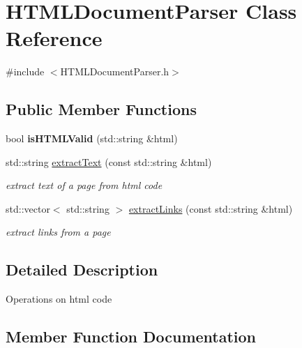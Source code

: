 \hypertarget{classHTMLDocumentParser}{}\section{H\+T\+M\+L\+Document\+Parser Class Reference}
\label{classHTMLDocumentParser}


{\ttfamily \#include $<$H\+T\+M\+L\+Document\+Parser.\+h$>$}

\subsection*{Public Member Functions}
\begin{DoxyCompactItemize}
\item 
bool {\bfseries is\+H\+T\+M\+L\+Valid} (std\+::string \&html)\hypertarget{classHTMLDocumentParser_a30e99ba7e6164ab947b8521e8a560b66}{}\label{classHTMLDocumentParser_a30e99ba7e6164ab947b8521e8a560b66}

\item 
std\+::string \hyperlink{classHTMLDocumentParser_af6e652d8ebeaba42076efb746745db15}{extract\+Text} (const std\+::string \&html)
\begin{DoxyCompactList}\small\item\em extract text of a page from html code \end{DoxyCompactList}\item 
std\+::vector$<$ std\+::string $>$ \hyperlink{classHTMLDocumentParser_af1dd1a2f93dcb83aacf61c4a4623511f}{extract\+Links} (const std\+::string \&html)
\begin{DoxyCompactList}\small\item\em extract links from a page \end{DoxyCompactList}\end{DoxyCompactItemize}


\subsection{Detailed Description}
Operations on html code 

\subsection{Member Function Documentation}
